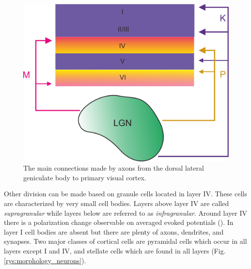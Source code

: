 \documentclass{pracalicmgr}
\begin{document}
   \begin{figure}[H]
   	\begin{center}
   		\includegraphics[scale=0.4]{aga_LGN.png}
   	\end{center}
   	\caption{The main connections made by axons from the dorsal lateral geniculate body to primary visual cortex.}
   	\label{rys:lgn}
   \end{figure}  
   \newpage
   Other division can be made based on granule cells located in layer IV. These cells are characterized by very small cell bodies. Layers above layer IV are called \emph{supragranular} while layers below are referred to as \emph{infragranular}. Around layer IV there is a polarization change observable on averaged evoked potentials (\cite{maier2010}). In layer I cell bodies are absent but there are plenty of axons, dendrites, and synapses. Two major classes of cortical cells are pyramidal cells which occur in all layers except I and IV, and stellate cells which are found in all layers (Fig. \ref{rys:morphology_neurons}).
   
\end{document}
